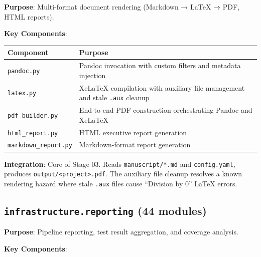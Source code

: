 \documentclass[
]{article}
\newcounter{none} %
\begin{document}
\textbf{Purpose}: Multi-format document rendering (Markdown → LaTeX →
PDF, HTML reports).

\textbf{Key Components}:

{\def\LTcaptype{none} %
\begin{longtable}[]{@{}
  >{\raggedright\arraybackslash}p{}
  >{\raggedright\arraybackslash}p{}@{}}
\toprule\noalign{}
\begin{minipage}[b]{\linewidth}\raggedright
Component
\end{minipage} & \begin{minipage}[b]{\linewidth}\raggedright
Purpose
\end{minipage} \\
\midrule\noalign{}
\endhead
\bottomrule\noalign{}
\endlastfoot
\texttt{pandoc.py} & Pandoc invocation with custom filters and metadata
injection \\
\texttt{latex.py} & XeLaTeX compilation with auxiliary file management
and stale \texttt{.aux} cleanup \\
\texttt{pdf\_builder.py} & End-to-end PDF construction orchestrating
Pandoc and XeLaTeX \\
\texttt{html\_report.py} & HTML executive report generation \\
\texttt{markdown\_report.py} & Markdown-format report generation \\
\end{longtable}
}

\textbf{Integration}: Core of Stage 03. Reads \texttt{manuscript/*.md}
and \texttt{config.yaml}, produces
\texttt{output/\textless{}project\textgreater{}.pdf}. The auxiliary file
cleanup resolves a known rendering hazard where stale \texttt{.aux}
files cause ``Division by 0'' LaTeX errors.

\subsection{\texorpdfstring{\texttt{infrastructure.reporting} (44
modules)}{infrastructure.reporting (44 modules)}}\label{infrastructure.reporting-44-modules}

\textbf{Purpose}: Pipeline reporting, test result aggregation, and
coverage analysis.

\textbf{Key Components}:
\end{document}
